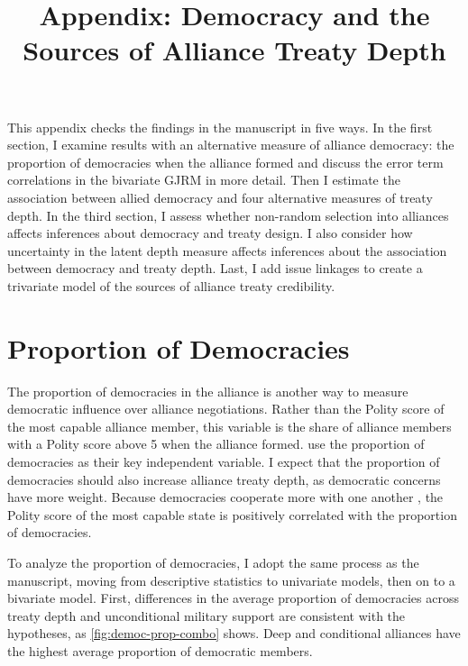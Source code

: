 \documentclass[12pt]{article}
\title{\textbf{Appendix: Democracy and the Sources of Alliance Treaty Depth}}
\author{}
\date{}
\begin{document}
\maketitle 

\doublespace 

This appendix checks the findings in the manuscript in five ways. 
In the first section, I examine results with an alternative measure of alliance democracy: the proportion of democracies when the alliance formed and discuss the error term correlations in the bivariate GJRM in more detail. 
Then I estimate the association between allied democracy and four alternative measures of treaty depth.
In the third section, I assess whether non-random selection into alliances affects inferences about democracy and treaty design.   
I also consider how uncertainty in the latent depth measure affects inferences about the association between democracy and treaty depth. 
Last, I add issue linkages to create a trivariate model of the sources of alliance treaty credibility. 


\section{Proportion of Democracies}


The proportion of democracies in the alliance is another way to measure democratic influence over alliance negotiations.  
Rather than the Polity score of the most capable alliance member, this variable is the share of alliance members with a Polity score above 5 when the alliance formed. 
\citet{Chibaetal2015} use the proportion of democracies as their key independent variable. 
I expect that the proportion of democracies should also increase alliance treaty depth, as democratic concerns have more weight.
Because democracies cooperate more with one another \citep{Leeds1999}, the Polity score of the most capable state is positively correlated with the proportion of democracies. 


To analyze the proportion of democracies, I adopt the same process as the manuscript, moving from descriptive statistics to univariate models, then on to a bivariate model. 
First, differences in the average proportion of democracies across treaty depth and unconditional military support are consistent with the hypotheses, as \autoref{fig:democ-prop-combo} shows.
Deep and conditional alliances have the highest average proportion of democratic members.
\end{document}
